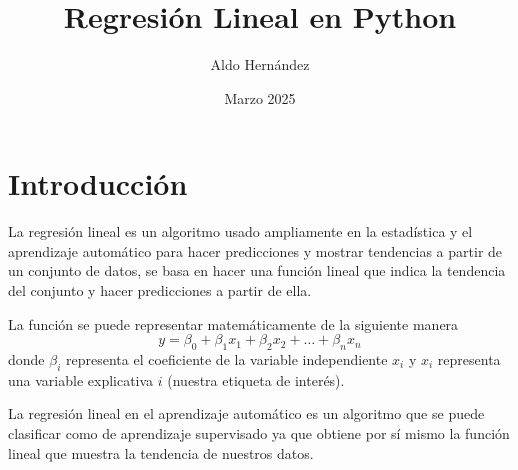 \documentclass[12pt, letterpaper]{article}
\title{Regresión Lineal en Python}
\author{Aldo Hernández}
\date{Marzo 2025}
\begin{document}
    \maketitle
    \section{Introducción}
    La regresión lineal es un algoritmo usado ampliamente en la estadística y el aprendizaje automático para hacer predicciones y mostrar tendencias a partir de un conjunto de datos, se basa en hacer una función lineal que indica la tendencia del conjunto y hacer predicciones a partir de ella. \par
    La función se puede representar matemáticamente de la siguiente manera
    \begin{equation*}
        y = \beta_{0} + \beta_{1}x_{1} + \beta_{2}x_{2} + \dots + \beta_{n}x_{n}
    \end{equation*}
    donde $\beta_{i}$ representa el coeficiente de la variable independiente $x_{i}$ y $x_{i}$ representa una variable explicativa $i$ (nuestra etiqueta de interés). \par
    La regresión lineal en el aprendizaje automático es un algoritmo que se puede clasificar como de aprendizaje supervisado ya que obtiene por sí mismo la función lineal que muestra la tendencia de nuestros datos.
\end{document}
